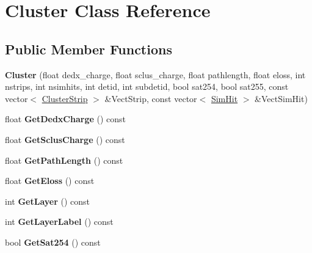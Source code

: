 \hypertarget{class_cluster}{}\section{Cluster Class Reference}
\label{class_cluster}
\subsection*{Public Member Functions}
\begin{DoxyCompactItemize}
\item 
\mbox{\label{class_cluster_aab299b3dd65497d3c76cdf757cb65ac8}} 
{\bfseries Cluster} (float dedx\+\_\+charge, float sclus\+\_\+charge, float pathlength, float eloss, int nstrips, int nsimhits, int detid, int subdetid, bool sat254, bool sat255, const vector$<$ \mbox{\hyperlink{class_cluster_strip}{Cluster\+Strip}} $>$ \&Vect\+Strip, const vector$<$ \mbox{\hyperlink{class_sim_hit}{Sim\+Hit}} $>$ \&Vect\+Sim\+Hit)
\item 
\mbox{\label{class_cluster_a2b6d2ba12ff9a1c18c1a08dda8ea36dc}} 
float {\bfseries Get\+Dedx\+Charge} () const
\item 
\mbox{\label{class_cluster_a4d8a022f25f2eea5b0945efdb8777f6e}} 
float {\bfseries Get\+Sclus\+Charge} () const
\item 
\mbox{\label{class_cluster_ac20d92c75283f3001e6215de1405205f}} 
float {\bfseries Get\+Path\+Length} () const
\item 
\mbox{\label{class_cluster_a27c1e1a282a11364cf40fb07122044a5}} 
float {\bfseries Get\+Eloss} () const
\item 
\mbox{\label{class_cluster_acafc6f7a4b2fccde9e1522ee7cc8e031}} 
int {\bfseries Get\+Layer} () const
\item 
\mbox{\label{class_cluster_a0b96e008ae1c046c3c1f5adc51597062}} 
int {\bfseries Get\+Layer\+Label} () const
\item 
\mbox{\label{class_cluster_a16b9626c21be102ea2336d370efdaf0e}} 
bool {\bfseries Get\+Sat254} () const
\item 
\mbox{\label{class_cluster_a54caed33e9c133dd879186c081ca0bdf}} 

\end{DoxyCompactItemize}
